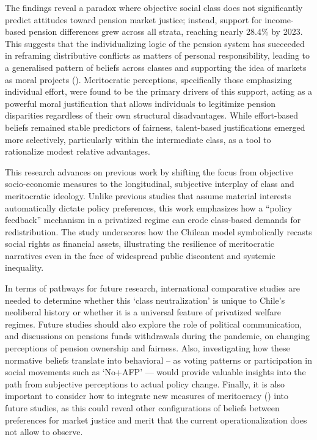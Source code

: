 \documentclass[
  12pt,
]{article}
\begin{document}
The findings reveal a paradox where objective social class does not
significantly predict attitudes toward pension market justice; instead,
support for income-based pension differences grew across all strata,
reaching nearly 28.4\% by 2023. This suggests that the individualizing
logic of the pension system has succeeded in reframing distributive
conflicts as matters of personal responsibility, leading to a
generalised pattern of beliefs across classes and supporting the idea of
markets as moral projects (). Meritocratic perceptions, specifically those
emphasizing individual effort, were found to be the primary drivers of
this support, acting as a powerful moral justification that allows
individuals to legitimize pension disparities regardless of their own
structural disadvantages. While effort-based beliefs remained stable
predictors of fairness, talent-based justifications emerged more
selectively, particularly within the intermediate class, as a tool to
rationalize modest relative advantages.

This research advances on previous work by shifting the focus from
objective socio-economic measures to the longitudinal, subjective
interplay of class and meritocratic ideology. Unlike previous studies
that assume material interests automatically dictate policy preferences,
this work emphasizes how a ``policy feedback'' mechanism in a privatized
regime can erode class-based demands for redistribution. The study
underscores how the Chilean model symbolically recasts social rights as
financial assets, illustrating the resilience of meritocratic narratives
even in the face of widespread public discontent and systemic
inequality.

In terms of pathways for future research, international comparative
studies are needed to determine whether this `class neutralization' is
unique to Chile's neoliberal history or whether it is a universal
feature of privatized welfare regimes. Future studies should also
explore the role of political communication, and discussions on pensions
funds withdrawals during the pandemic, on changing perceptions of
pension ownership and fairness. Also, investigating how these normative
beliefs translate into behavioral -- as voting patterns or participation
in social movements such as `No+AFP' --- would provide valuable insights
into the path from subjective perceptions to actual policy change.
Finally, it is also important to consider how to integrate new measures
of meritocracy () into future studies, as this could reveal other
configurations of beliefs between preferences for market justice and
merit that the current operationalization does not allow to observe.
\end{document}
